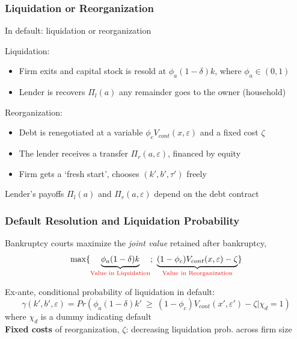 \documentclass[aspectratio=169,xcolor=table]{beamer}
\begin{document}
\begin{frame}[label=LiqReorg] \frametitle{Liquidation or Reorganization}

In default: liquidation or reorganization  \hfill \hyperlink{Default}{} \vspace{3mm}

Liquidation: 
\begin{itemize} \small
    \item Firm exits and capital stock is resold at $\phi_a(1-\delta)k$, where $\phi_a \in (0,1)$  
    \item Lender is recovers $\Pi_l(a)$ any remainder goes to the owner (household)
\end{itemize} \normalsize \vspace{3mm}

Reorganization: 
\begin{itemize} \small
\item Debt is renegotiated at a variable $\phi_c V_{cont}(x,\varepsilon)$ and a fixed cost $\zeta$ 
\item The lender receives a transfer $\Pi_r(a,\varepsilon)$, financed by equity
\item Firm gets a ‘fresh start’, chooses $(k', b', \tau')$ freely
\end{itemize} \normalsize

Lender’s payoffs $\Pi_l(a)$ and $\Pi_r(a,\varepsilon)$ depend on the debt contract

\end{frame}

\begin{frame}[label=LiqReorg] \frametitle{Default Resolution and Liquidation Probability}

Bankruptcy courts maximize the \textit{joint value} retained after bankruptcy,
\begin{equation*} \label{eq:liquidation decision}
    \max \{ \underbrace{\phi_a (1-\delta) k}_{\textcolor{red}{\text{Value in Liquidation}}}   ; \ \underbrace{(1-\phi_c) V_{cont}(x,\varepsilon)- \zeta}_{\textcolor{red}{\text{Value in Reorganization}}}   \} 
\end{equation*}

Ex-ante, conditional probability of liquidation in default: 
\begin{equation*} \label{eq:liquidation probability}
    \gamma(k', b', \varepsilon) = Pr(\phi_a (1-\delta) k' \ \geq \ (1-\phi_c) V_{cont}(x',\varepsilon') - \zeta | \chi_d = 1)
\end{equation*}  
where $\chi_d$ is a dummy indicating default \vspace{5mm} \\
\textbf{Fixed costs} of reorganization, $\zeta$: decreasing liquidation prob. across firm size  

\end{frame}
\end{document}
